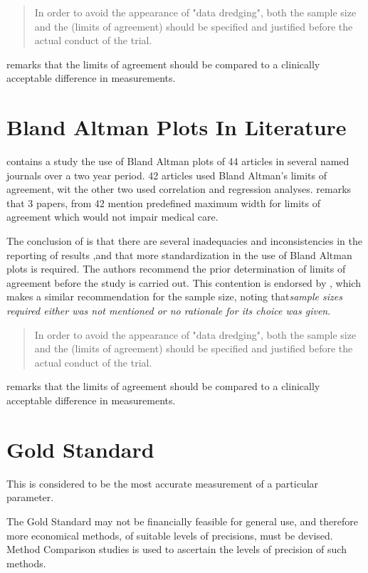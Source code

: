 \documentclass[Main.tex]{subfiles}
\begin{document}
	\begin{quote}
		In order to avoid the appearance of "data dredging", both the
		sample size and the (limits of agreement) should be specified and
		justified before the actual conduct of the trial. \citep{lin}
	\end{quote}
	
	\citet{Dewitte} remarks that the limits of agreement should be
	compared to a clinically acceptable difference in measurements.
	
\section{Bland Altman Plots In Literature}
\citet{mantha} contains a study the use of Bland Altman plots of
44 articles in several named journals over a two year period. 42
articles used Bland Altman's limits of agreement, wit the other
two used correlation and regression analyses. \citet{mantha}
remarks that 3 papers, from 42 mention predefined maximum width
for limits of agreement which would not impair medical care.

The conclusion of \citet{mantha} is that there are several
inadequacies and inconsistencies in the reporting of results ,and
that more standardization in the use of Bland Altman plots is
required. The authors recommend the prior determination of limits
of agreement before the study is carried out. This contention is
endorsed by \citet{lin}, which makes a similar recommendation for
the sample size, noting that\emph{sample sizes required either was
	not mentioned or no rationale for its choice was given}.

\begin{quote}
	In order to avoid the appearance of "data dredging", both the
	sample size and the (limits of agreement) should be specified and
	justified before the actual conduct of the trial. \citep{lin}
\end{quote}

\citet{Dewitte} remarks that the limits of agreement should be compared to a clinically acceptable difference in measurements.


	
	
	\section{Gold Standard} This is considered to be the most
	accurate measurement of a particular parameter.
	
	The Gold Standard may not be financially feasible for general use, and therefore more economical methods, of suitable levels of precisions, must be devised. Method Comparison studies is used to ascertain the levels of precision of such methods.
	\smallskip
	





\end{document}
